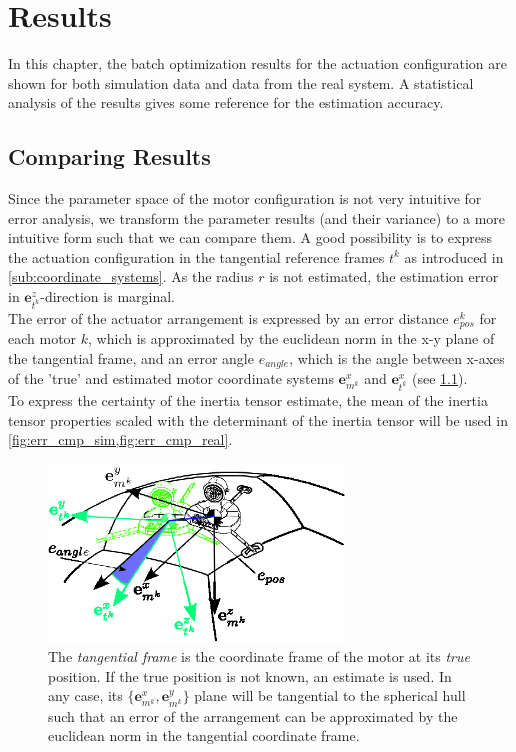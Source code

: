 \chapter{Results}
\label{chap:simulation_results}
In this chapter, the batch optimization results for the actuation configuration are shown for both simulation data and data from the real system.
A statistical analysis of the results gives some reference for the estimation accuracy.

\section{Comparing Results}
\label{sec:comparing_results}
Since the parameter space of the motor configuration is not very intuitive for error analysis,
we transform the parameter results (and their variance) to a more intuitive form such that we can compare them.
A good possibility is to express the actuation configuration in the tangential reference frames $t^k$ as introduced in \cref{sub:coordinate_systems}.
As the radius $r$ is not estimated, the estimation error in
$ \mathbf{e}_{t^k}^z $-direction is marginal.
\\
The error of the actuator arrangement is expressed by an error distance $e_{pos}^k$ for each motor $k$, which is approximated by the euclidean norm in the x-y plane of the tangential frame,
and an error angle $e_{angle}$, which is the angle between x-axes of the 'true' and estimated motor coordinate systems $\mathbf{e}_{m^k}^x$ and $\mathbf{e}_{t^k}^x$
(see \ref{fig:tangential_frame}).
\\
To express the certainty of the inertia tensor estimate, the mean of the inertia tensor properties scaled with the determinant of the inertia tensor will be used in \cref{fig:err_cmp_sim,fig:err_cmp_real}.

\begin{figure}[hbtp]
\centering
\includegraphics[width = 0.7\textwidth]{images/tangential_frame.eps}
\caption{The \textit{tangential frame} is the coordinate frame of the motor at its \textit{true} position. If the true position is not known, an estimate is used. In any case, its $\lbrace \mathbf{e}^x_{m^k} , \mathbf{e}^y_{m^k} \rbrace$ plane will be tangential to the spherical hull such that an error of the arrangement can be approximated by the euclidean norm in the tangential coordinate frame.}
\label{fig:tangential_frame}
\end{figure}

